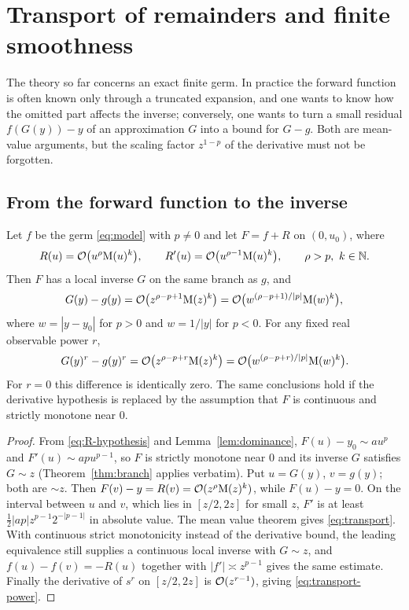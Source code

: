\section{Transport of remainders and finite smoothness}
\label{sec:transport}

The theory so far concerns an exact finite germ. In practice the forward function is often known only through a truncated expansion, and one wants to know how the omitted part affects the inverse; conversely, one wants to turn a small residual $f(G(y))-y$ of an approximation $G$ into a bound for $G-g$. Both are mean-value arguments, but the scaling factor $z^{1-p}$ of the derivative must not be forgotten.

\subsection{From the forward function to the inverse}

\begin{theorem}
\label{thm:transport}
Let $f$ be the germ \eqref{eq:model} with $p\ne0$ and let $F=f+R$ on $(0,u_0)$, where
\begin{equation}
 R(u)=\mathcal O\bigl(u^\rho\mathrm M(u)^k\bigr),\qquad R'(u)=\mathcal O\bigl(u^{\rho-1}\mathrm M(u)^k\bigr),\qquad \rho>p,\ k\in\mathbb N .
 \label{eq:R-hypothesis}
\end{equation}
Then $F$ has a local inverse $G$ on the same branch as $g$, and
\begin{equation}
 G(y)-g(y)=\mathcal O\bigl(z^{\rho-p+1}\mathrm M(z)^k\bigr)=\mathcal O\bigl(w^{(\rho-p+1)/|p|}\mathrm M(w)^k\bigr),
 \label{eq:transport}
\end{equation}
where $w=|y-y_0|$ for $p>0$ and $w=1/|y|$ for $p<0$. For any fixed real observable power $r$,
\begin{equation}
 G(y)^r-g(y)^r=\mathcal O\bigl(z^{\rho-p+r}\mathrm M(z)^k\bigr)
 =\mathcal O\bigl(w^{(\rho-p+r)/|p|}\mathrm M(w)^k\bigr).
 \label{eq:transport-power}
\end{equation}
For $r=0$ this difference is identically zero. The same conclusions hold if the derivative hypothesis is replaced by the assumption that $F$ is continuous and strictly monotone near $0$.
\end{theorem}
\begin{proof}
From \eqref{eq:R-hypothesis} and Lemma~\ref{lem:dominance}, $F(u)-y_0\sim au^p$ and $F'(u)\sim apu^{p-1}$, so $F$ is strictly monotone near $0$ and its inverse $G$ satisfies $G\sim z$ (Theorem~\ref{thm:branch} applies verbatim). Put $u=G(y)$, $v=g(y)$; both are $\sim z$. Then $F(v)-y=R(v)=\mathcal O(z^\rho\mathrm M(z)^k)$, while $F(u)-y=0$. On the interval between $u$ and $v$, which lies in $[z/2,2z]$ for small $z$, $F'$ is at least $\frac12|ap|z^{p-1}2^{-|p-1|}$ in absolute value. The mean value theorem gives \eqref{eq:transport}. With continuous strict monotonicity instead of the derivative bound, the leading equivalence still supplies a continuous local inverse with $G\sim z$, and $f(u)-f(v)=-R(u)$ together with $|f'|\asymp z^{p-1}$ gives the same estimate. Finally the derivative of $s^r$ on $[z/2,2z]$ is $\mathcal O(z^{r-1})$, giving \eqref{eq:transport-power}.
\end{proof}

